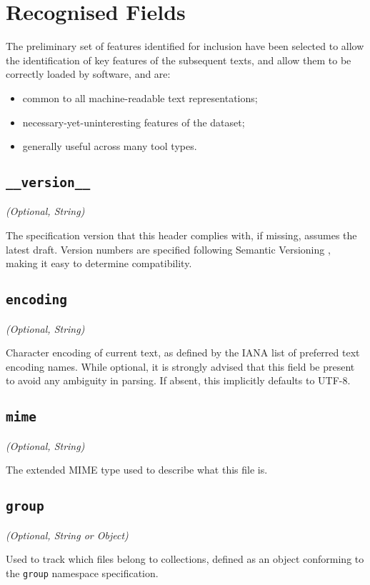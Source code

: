 \chapter{Recognised Fields}
The preliminary set of features identified for inclusion have been selected to allow the identification of key features of the subsequent texts, and allow them to be correctly loaded by software, and are:

\begin{itemize}
    \item common to all machine-readable text representations;
    \item necessary-yet-uninteresting features of the dataset;
    \item generally useful across many tool types.
\end{itemize}



\section{\texttt{\_\_version\_\_}}
\textit{(Optional, String)}

The specification version that this header complies with, if missing, assumes the latest draft.
Version numbers are specified following Semantic Versioning \cite{semver}, making it easy to determine compatibility.


\section{\texttt{encoding}}
\textit{(Optional, String)}

Character encoding of current text, as defined by the IANA list of preferred text encoding names\cite{EncodingNames}.
While optional, it is strongly advised that this field be present to avoid any ambiguity in parsing.
If absent, this implicitly defaults to UTF-8.

\section{\texttt{mime}}
\textit{(Optional, String)}

The extended MIME\cite{MIMETypes} type used to describe what this file is.


\section{\texttt{group}}
\textit{(Optional, String or Object)}

Used to track which files belong to collections, defined as an object conforming to the \texttt{group} namespace specification.